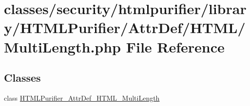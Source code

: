 \hypertarget{MultiLength_8php}{\section{classes/security/htmlpurifier/library/\+H\+T\+M\+L\+Purifier/\+Attr\+Def/\+H\+T\+M\+L/\+Multi\+Length.php File Reference}
\label{MultiLength_8php}
}
\subsection*{Classes}
\begin{DoxyCompactItemize}
\item 
class \hyperlink{classHTMLPurifier__AttrDef__HTML__MultiLength}{H\+T\+M\+L\+Purifier\+\_\+\+Attr\+Def\+\_\+\+H\+T\+M\+L\+\_\+\+Multi\+Length}
\end{DoxyCompactItemize}
